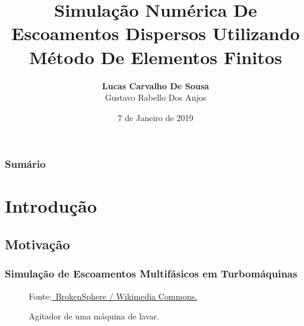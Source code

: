 \documentclass{beamer}
\title[Métodos Numéricos]{Simulação Numérica De Escoamentos Dispersos Utilizando Método De Elementos Finitos} %
\author{\textbf{Lucas Carvalho De Sousa} \\ Gustavo Rabello Dos Anjos} %
\institute[UERJ] %
{
  Universidade do Estado do Rio de Janeiro \\ %
  \medskip
  \href{mailto:encarvlucas@hotmail.com}{\textit{encarvlucas@hotmail.com}} %
}
\date{7 de Janeiro de 2019} %
\newcommand{\figcopyright}[4]
{
  \begin{figure}
    \stackunder{
      \texttt{[image: \#1]}
    } {\raggedleft \tiny Fonte:\href{#2}{\textcopyright \ #3.}}
    \caption{#4}
  \end{figure}
}
\begin{document}
\begin{frame}
  \titlepage %
\end{frame}

\begin{frame}
  \frametitle{Sumário} %
  \tableofcontents %
\end{frame}


\section{Introdução} %

\subsection{Motivação} %
\begin{frame}
  \frametitle{Simulação de Escoamentos Multifásicos em Turbomáquinas}
  \figcopyright{figure/Washing_machine_agitator.jpg}
	       {https://commons.wikimedia.org/wiki/File:Washing_machine_agitator.JPG}
	       {BrokenSphere / Wikimedia Commons}
	       {Agitador de uma máquina de lavar.}
  
\end{frame}
\end{document}

